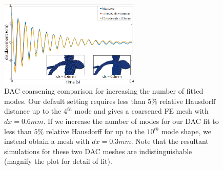 \begin{figure}
	\centering
	\includegraphics[width=0.6\textwidth]{images/coarseFineVibe.png}
	\caption{DAC coarsening comparison for increasing the number of fitted modes. Our default setting requires less than $5\%$ relative Hausdorff distance up to the $4^{th}$ mode and gives a coarsened FE mesh with $dx=0.6mm$. If we increase the number of modes for our DAC fit to less than $5\%$ relative Hausdorff for up to the $10^{th}$ mode shape, we instead obtain a mesh with $dx=0.3mm$. Note that the resultant simulations for these two DAC meshes are indistinguishable (magnify the plot for detail of fit). }
	\label{fig:error}
\end{figure}

